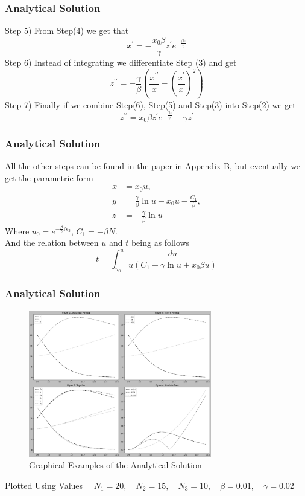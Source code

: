 \documentclass{beamer}
\begin{document}
\begin{frame}\frametitle{Analytical Solution}
    Step 5) From Step(4) we get that 
    \begin{equation*} 
        x^{\prime} = -\frac{x_{0}\beta}{\gamma} z^{\prime} e^{-\frac{\beta z}{\gamma}}
    \end{equation*}
    Step 6) Instead of integrating we differentiate Step (3) and get
    \begin{equation*}
        z^{\prime\prime} = -\frac{\gamma}{\beta}\left(\frac{x^{\prime\prime}}{x} - \left(\frac{x^{\prime}}{x}\right)^{2} \right)
    \end{equation*}
    Step 7) Finally if we combine Step(6), Step(5) and Step(3) into Step(2) we get
    \begin{equation*}
        z^{\prime\prime} = x_{0} \beta z^{\prime} e^{-\frac{\beta z}{\gamma}} - \gamma z^{\prime}
    \end{equation*}
\end{frame}

\begin{frame}\frametitle{Analytical Solution}
    All the other steps can be found in the paper in Appendix B, but eventually we get the parametric form
    \begin{align*}
        x &= x_0u,\\
        y &= \frac{\gamma}{\beta}\ln u - x_0u - \frac{C_1}{\beta},\\
        z &= -\frac{\gamma}{\beta}\ln u
    \end{align*}
Where $u_0 = e^{-\frac{\beta}{\gamma}N_3}$, $C_1 = -\beta N$.\\
And the relation between $u$ and $t$ being as follows
\begin{equation*} 
	t = \int_{u_0}^{u} \frac{du}{u(C_1-\gamma \ln u + x_0\beta u)}
\end{equation*}
\end{frame}
\begin{frame}\frametitle{Analytical Solution}
    \begin{figure}
        \caption{Graphical Examples of the Analytical Solution}
        \centering
        \includegraphics[width=8cm]{Figure_Analitical.png}
    \end{figure}

    Plotted Using Values$\quad$ $N_1=20, \quad N_2=15, \quad N_3=10, \quad \beta = 0.01, \quad \gamma = 0.02$
\end{frame}
\end{document}
